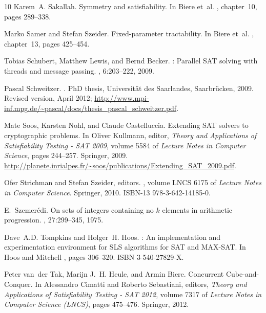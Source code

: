 \documentclass[final,3p,times]{elsarticle}
\theoremstyle{definition}
\begin{document}
\begin{thebibliography}{10}
Karem~A. Sakallah.
\newblock Symmetry and satisfiability.
\newblock In Biere et~al. \cite{2008HandbuchSAT}, chapter~10, pages 289--338.

Marko Samer and Stefan Szeider.
\newblock Fixed-parameter tractability.
\newblock In Biere et~al. \cite{2008HandbuchSAT}, chapter~13, pages 425--454.

Tobias Schubert, Matthew Lewis, and Bernd Becker.
: Parallel {SAT} solving with threads and message passing.
,
  6:203--222, 2009.

Pascal Schweitzer.
.
\newblock PhD thesis, Universit{\"{a}}t des Saarlandes, Saarbr{\"{u}}cken,
  2009.
\newblock Revised version, April 2012;
  \url{http://www.mpi-inf.mpg.de/~pascal/docs/thesis_pascal_schweitzer.pdf}.

Mate Soos, Karsten Nohl, and Claude Castelluccia.
\newblock Extending {SAT} solvers to cryptographic problems.
\newblock In Oliver Kullmann, editor, {\em Theory and Applications of
  Satisfiability Testing - SAT 2009}, volume 5584 of {\em Lecture Notes in
  Computer Science}, pages 244--257. Springer, 2009.
\newblock
  \url{http://planete.inrialpes.fr/~soos/publications/Extending_SAT_2009.pdf}.

Ofer Strichman and Stefan Szeider, editors.
,
  volume LNCS 6175 of {\em Lecture Notes in Computer Science}. Springer, 2010.
\newblock ISBN-13 978-3-642-14185-0.

E.~Szemer{\'{e}}di.
\newblock On sets of integers containing no $k$ elements in arithmetic
  progression.
, 27:299--345, 1975.

Dave~A.D. Tompkins and Holger~H. Hoos.
: An implementation and experimentation environment for {SLS}
  algorithms for {SAT} and {MAX-SAT}.
\newblock In Hoos and Mitchell \cite{Vancouver2004b}, pages 306--320.
\newblock ISBN 3-540-27829-X.

Peter van~der Tak, Marijn J.~H. Heule, and Armin Biere.
\newblock Concurrent {C}ube-and-{C}onquer.
\newblock In Alessandro Cimatti and Roberto Sebastiani, editors, {\em Theory
  and Applications of Satisfiability Testing - SAT 2012}, volume 7317 of {\em
  Lecture Notes in Computer Science (LNCS)}, pages 475--476. Springer, 2012.


\end{thebibliography}
\end{document}
